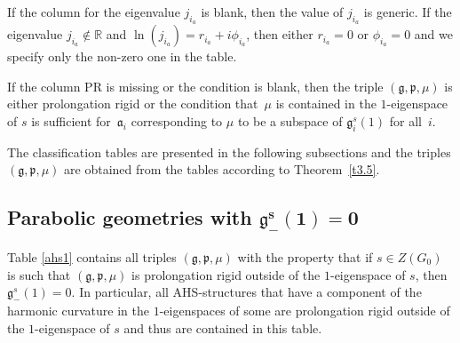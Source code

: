 \documentclass[10pt,a4paper]{amsart}
\newcommand{\fg}{\mathfrak g}
\newcommand{\fp}{\mathfrak p}
\newcommand{\R}{\mathbb{R}}
\numberwithin{equation}{section}
\begin{document}
If the column for the eigenvalue $j_{i_a}$ is blank, then the value of $j_{i_a}$ is generic. If the eigenvalue $j_{i_a}\notin \R$ and $\ln(j_{i_a}) = r_{i_a} +i\phi_{i_a}$, then either $r_{i_a}=0$ or $\phi_{i_a}=0$ and we specify only the non-zero one in the table.

If the column PR is missing or the condition is blank, then the triple $(\fg,\fp,\mu)$ is either prolongation rigid or the condition that~$\mu$ is contained in the $1$-eigenspace of $s$ is suf\/f\/icient for~$\mathfrak{a}_i$ corresponding to $\mu$ to be a subspace of $\fg_i^s(1)$ for all~$i$.

The classif\/ication tables are presented in the following subsections and the triples $(\fg,\fp,\mu)$ are obtained from the tables according to Theorem~\ref{t3.5}.

\subsection[Parabolic geometries with $\fg_-^s(1)=0$]{Parabolic geometries with $\boldsymbol{\fg_-^s(1)=0}$}\label{sec5.1}

Table \ref{ahs1} contains all triples $(\fg,\fp,\mu)$ with the property that if $s\in Z(G_0)$ is such that $(\fg,\fp,\mu)$ is prolongation rigid outside of the $1$-eigenspace of $s$, then $\fg_-^s(1)=0$. In particular, all AHS-structures that have a component of the harmonic curvature in the $1$-eigenspaces of some  are prolongation rigid outside of the $1$-eigenspace of $s$ and thus are contained in this table.
\end{document}
